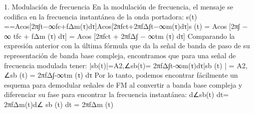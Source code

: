 1. Modulación de
frecuencia En la modulación de frecuencia, el mensaje se codifica en la frecuencia instantánea de la onda portadora:
s(t) ==Acos[2π∫t−∞fc+fΔm(τ)dτ]Acos[2πfct+2πfΔ∫t−∞m(τ)dτ]s (t) = Acos⁡ [2π∫ − ∞ tfc + fΔm (τ) dτ] = Acos⁡ [2πfct + 2πfΔ∫ − ∞tm (τ) dτ]
Comparando la expresión anterior con la última fórmula que da la señal de banda de paso de su representación de banda base compleja, encontramos que para una señal de frecuencia modulada tener:
|sb(t)|=A2,∠sb(t)= 2πfΔ∫t-∞m(τ)dτ|sb (t) | = A2, ∠sb (t) = 2πfΔ∫-∞tm (τ) dτ
Por lo tanto, podemos encontrar fácilmente un esquema para demodular señales de FM al convertir a banda base compleja y diferenciar su fase para encontrar la frecuencia instantánea:
d∠sb(t) dt= 2πfΔm(t)d∠ sb (t) dt = 2πfΔm (t)
  